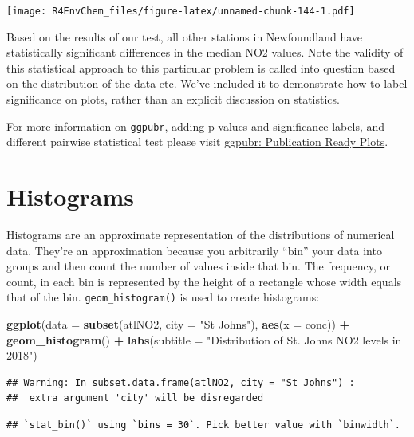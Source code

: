 \documentclass[
]{book}
\newenvironment{Shaded}{\begin{snugshade}}{\end{snugshade}}
\newcommand{\AttributeTok}[1]{\textcolor[rgb]{0.13,0.29,0.53}{#1}}
\newcommand{\FunctionTok}[1]{\textcolor[rgb]{0.13,0.29,0.53}{\textbf{#1}}}
\newcommand{\NormalTok}[1]{#1}
\newcommand{\SpecialCharTok}[1]{\textcolor[rgb]{0.81,0.36,0.00}{\textbf{#1}}}
\newcommand{\StringTok}[1]{\textcolor[rgb]{0.31,0.60,0.02}{#1}}
\begin{document}
\texttt{[image: R4EnvChem\_files/figure-latex/unnamed-chunk-144-1.pdf]}

Based on the results of our test, all other stations in Newfoundland have statistically significant differences in the median NO2 values. Note the validity of this statistical approach to this particular problem is called into question based on the distribution of the data etc. We've included it to demonstrate how to label significance on plots, rather than an explicit discussion on statistics.

For more information on \texttt{ggpubr}, adding p-values and significance labels, and different pairwise statistical test please visit \href{http://www.sthda.com/english/articles/24-ggpubr-publication-ready-plots/}{ggpubr: Publication Ready Plots}.

\hypertarget{histograms}{%
\section{Histograms}\label{histograms}}

Histograms are an approximate representation of the distributions of numerical data. They're an approximation because you arbitrarily ``bin'' your data into groups and then count the number of values inside that bin. The frequency, or count, in each bin is represented by the height of a rectangle whose width equals that of the bin. \texttt{geom\_histogram()} is used to create histograms:

\begin{Shaded}
\begin{Highlighting}[]
\FunctionTok{ggplot}\NormalTok{(}\AttributeTok{data =} \FunctionTok{subset}\NormalTok{(atlNO2, }\AttributeTok{city =} \StringTok{"St Johns"}\NormalTok{), }
       \FunctionTok{aes}\NormalTok{(}\AttributeTok{x =}\NormalTok{ conc)) }\SpecialCharTok{+}
  \FunctionTok{geom\_histogram}\NormalTok{() }\SpecialCharTok{+}
  \FunctionTok{labs}\NormalTok{(}\AttributeTok{subtitle =} \StringTok{"Distribution of St. Johns\textquotesingle{} NO2 levels in 2018"}\NormalTok{)}
\end{Highlighting}
\end{Shaded}

\begin{verbatim}
## Warning: In subset.data.frame(atlNO2, city = "St Johns") :
##  extra argument 'city' will be disregarded
\end{verbatim}

\begin{verbatim}
## `stat_bin()` using `bins = 30`. Pick better value with `binwidth`.
\end{verbatim}
\end{document}
